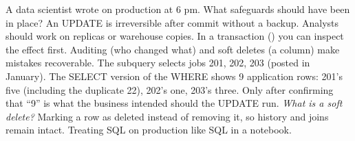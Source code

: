 \begin{qa}{\deep A data scientist wrote  on production at 6 pm. What safeguards should have been in place?}
\why An UPDATE is irreversible after commit without a backup. Analysts should work on replicas or warehouse copies. In a transaction () you can inspect the effect first. Auditing (who changed what) and soft deletes (a 
column) make mistakes recoverable.
\worked The subquery selects jobs 201, 202, 203 (posted in January). The SELECT version of the WHERE shows 9 application rows: 201's five (including the
duplicate 22), 202's one, 203's three. Only after confirming that ``9'' is what the business intended should the UPDATE run.
\pushes \emph{What is a soft delete?} Marking a row as deleted instead of removing it, so history and joins remain intact.
\pitfall Treating SQL on production like SQL in a notebook.
\end{qa}
